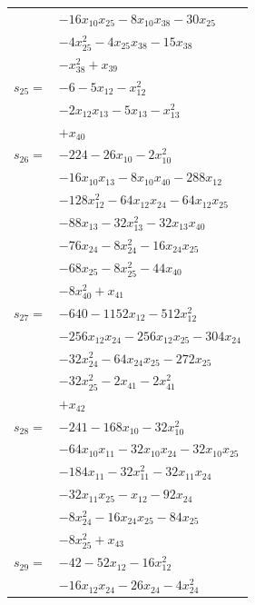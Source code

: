 \begin{longtable}{@{}r@{\;}l@{}}
 & \(\displaystyle -16x_{10}x_{25} -8x_{10}x_{38} -30x_{25}\) \\
 & \(\displaystyle -4x_{25}^{2} -4x_{25}x_{38} -15x_{38}\) \\
 & \(\displaystyle -x_{38}^{2} +x_{39}\) \\[3pt]
\(s_{25}=\) & \(\displaystyle -6 -5x_{12} -x_{12}^{2}\) \\
 & \(\displaystyle -2x_{12}x_{13} -5x_{13} -x_{13}^{2}\) \\
 & \(\displaystyle +x_{40}\) \\[3pt]
\(s_{26}=\) & \(\displaystyle -224 -26x_{10} -2x_{10}^{2}\) \\
 & \(\displaystyle -16x_{10}x_{13} -8x_{10}x_{40} -288x_{12}\) \\
 & \(\displaystyle -128x_{12}^{2} -64x_{12}x_{24} -64x_{12}x_{25}\) \\
 & \(\displaystyle -88x_{13} -32x_{13}^{2} -32x_{13}x_{40}\) \\
 & \(\displaystyle -76x_{24} -8x_{24}^{2} -16x_{24}x_{25}\) \\
 & \(\displaystyle -68x_{25} -8x_{25}^{2} -44x_{40}\) \\
 & \(\displaystyle -8x_{40}^{2} +x_{41}\) \\[3pt]
\(s_{27}=\) & \(\displaystyle -640 -1152x_{12} -512x_{12}^{2}\) \\
 & \(\displaystyle -256x_{12}x_{24} -256x_{12}x_{25} -304x_{24}\) \\
 & \(\displaystyle -32x_{24}^{2} -64x_{24}x_{25} -272x_{25}\) \\
 & \(\displaystyle -32x_{25}^{2} -2x_{41} -2x_{41}^{2}\) \\
 & \(\displaystyle +x_{42}\) \\[3pt]
\(s_{28}=\) & \(\displaystyle -241 -168x_{10} -32x_{10}^{2}\) \\
 & \(\displaystyle -64x_{10}x_{11} -32x_{10}x_{24} -32x_{10}x_{25}\) \\
 & \(\displaystyle -184x_{11} -32x_{11}^{2} -32x_{11}x_{24}\) \\
 & \(\displaystyle -32x_{11}x_{25} -x_{12} -92x_{24}\) \\
 & \(\displaystyle -8x_{24}^{2} -16x_{24}x_{25} -84x_{25}\) \\
 & \(\displaystyle -8x_{25}^{2} +x_{43}\) \\[3pt]
\(s_{29}=\) & \(\displaystyle -42 -52x_{12} -16x_{12}^{2}\) \\
 & \(\displaystyle -16x_{12}x_{24} -26x_{24} -4x_{24}^{2}\) \\

\end{longtable}

